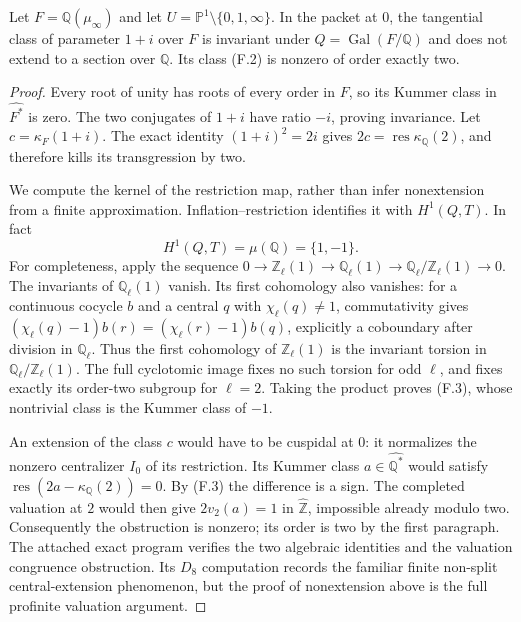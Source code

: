 \begin{proposition}
\label{F-one-plus-i}
Let $F=\mathbb Q(\mu_\infty)$ and let $U=\mathbb P^1\setminus
\{0,1,\infty\}$. In the packet at $0$, the tangential class of
parameter $1+i$ over $F$ is invariant under
$Q=\operatorname{Gal}(F/\mathbb Q)$ and does not extend to a section
over $\mathbb Q$. Its class (F.2) is nonzero of order exactly two.
\end{proposition}
\begin{proof}
Every root of unity has roots of every order in $F$, so its Kummer
class in $\widehat{F^*}$ is zero. The two conjugates of $1+i$
have ratio $-i$, proving invariance. Let $c=\kappa_F(1+i)$.
The exact identity $(1+i)^2=2i$ gives
$2c=\operatorname{res}\kappa_{\mathbb Q}(2)$, and therefore kills
its transgression by two.

We compute the kernel of the restriction map, rather than infer
nonextension from a finite approximation. Inflation--restriction
identifies it with $H^1(Q,T)$. In fact
\[
 H^1(Q,T)=\mu(\mathbb Q)=\{1,-1\}.                            \tag{F.3}
\]
For completeness, apply the sequence
$0\to\mathbb Z_\ell(1)\to\mathbb Q_\ell(1)\to
\mathbb Q_\ell/\mathbb Z_\ell(1)\to0$.
The invariants of $\mathbb Q_\ell(1)$ vanish. Its first cohomology
also vanishes: for a continuous cocycle $b$ and a central $q$ with
$\chi_\ell(q)\ne1$, commutativity gives
$(\chi_\ell(q)-1)b(r)=(\chi_\ell(r)-1)b(q)$, explicitly a
coboundary after division in $\mathbb Q_\ell$. Thus the first
cohomology of $\mathbb Z_\ell(1)$ is the invariant torsion in
$\mathbb Q_\ell/\mathbb Z_\ell(1)$. The full cyclotomic image
fixes no such torsion for odd $\ell$, and fixes exactly its order-two
subgroup for $\ell=2$. Taking the product proves (F.3), whose
nontrivial class is the Kummer class of $-1$.

An extension of the class $c$ would have to be cuspidal at $0$:
it normalizes the nonzero centralizer $I_0$ of its restriction.
Its Kummer class $a\in\widehat{\mathbb Q^*}$ would satisfy
$\operatorname{res}(2a-\kappa_{\mathbb Q}(2))=0$.
By (F.3) the difference is a sign. The completed valuation at $2$
would then give $2v_2(a)=1$ in $\widehat{\mathbb Z}$, impossible
already modulo two. Consequently the obstruction is nonzero;
its order is two by the first paragraph. The attached exact
program verifies the two algebraic identities and the valuation
congruence obstruction. Its $D_8$ computation records the familiar
finite non-split central-extension phenomenon, but the proof of
nonextension above is the full profinite valuation argument.
\end{proof}

